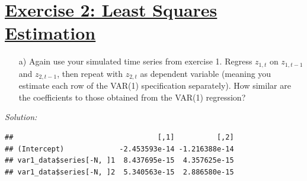 \documentclass[12pt,a4paper]{article}
\newcommand{\tmpsection}[1]{}
\let\tmpsection=\section
\renewcommand{\section}[1]{\tmpsection{\underline{#1}} }
\newenvironment{Shaded}{\begin{snugshade}}{\end{snugshade}}
\newcommand{\CommentTok}[1]{\textcolor[rgb]{0.56,0.35,0.01}{\textit{#1}}}
\newcommand{\DecValTok}[1]{\textcolor[rgb]{0.00,0.00,0.81}{#1}}
\newcommand{\KeywordTok}[1]{\textcolor[rgb]{0.13,0.29,0.53}{\textbf{#1}}}
\newcommand{\NormalTok}[1]{#1}
\newcommand{\OperatorTok}[1]{\textcolor[rgb]{0.81,0.36,0.00}{\textbf{#1}}}
\newcommand{\StringTok}[1]{\textcolor[rgb]{0.31,0.60,0.02}{#1}}
\begin{document}
\hypertarget{exercise-2-least-squares-estimation}{%
\section{Exercise 2: Least Squares
Estimation}\label{exercise-2-least-squares-estimation}}

\begin{itemize}
    \item[a)] Again use your simulated time series from exercise 1. Regress $z_{1,t}$ on $z_{1, t-1}$ and $z_{2,t-1}$, then repeat with $z_{2,t}$ as dependent variable (meaning you estimate each row of the VAR(1) specification separately). How similar are the coefficients to those obtained from the VAR(1) regression?
\end{itemize}

\emph{Solution:}

\begin{Shaded}
\end{Shaded}

\begin{verbatim}
##                                  [,1]          [,2]
## (Intercept)             -2.453593e-14 -1.216388e-14
## var1_data$series[-N, ]1  8.437695e-15  4.357625e-15
## var1_data$series[-N, ]2  5.340563e-15  2.886580e-15
\end{verbatim}
\end{document}
